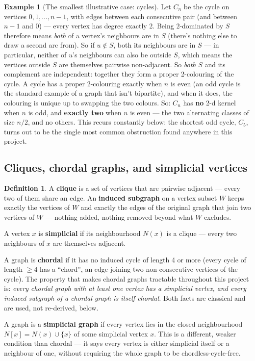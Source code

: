 \documentclass[11pt]{article}
\theoremstyle{plain}
\theoremstyle{definition}
\newtheorem{definition}[theorem]{Definition}
\newtheorem{example}[theorem]{Example}
\theoremstyle{remark}
\begin{document}
\begin{example}[The smallest illustrative case: cycles]
\label{ex:cycle}
Let $C_n$ be the cycle on vertices $0, 1, \dots, n-1$, with edges between each
consecutive pair (and between $n-1$ and $0$) — every vertex has degree exactly 2.
Being 2-dominated by $S$ therefore means \emph{both} of a vertex's neighbours are in
$S$ (there's nothing else to draw a second arc from). So if $u \notin S$, both its
neighbours are in $S$ --- in particular, neither of $u$'s neighbours can also be
outside $S$, which means the vertices outside $S$ are themselves pairwise
non-adjacent. So \emph{both} $S$ and its complement are independent: together they
form a proper 2-colouring of the cycle. A cycle has a proper 2-colouring exactly when
$n$ is even (an odd cycle is the standard example of a graph that isn't bipartite),
and when it does, the colouring is unique up to swapping the two colours. So: $C_n$
has \textbf{no} 2-d kernel when $n$ is odd, and \textbf{exactly two} when $n$ is even ---
the two alternating classes of size $n/2$, and no others. This recurs constantly
below: the shortest odd cycle, $C_5$, turns out to be the single most common
obstruction found anywhere in this project.
\end{example}

\subsection{Cliques, chordal graphs, and simplicial vertices}

\begin{definition}
A \textbf{clique} is a set of vertices that are pairwise adjacent — every two of them
share an edge. An \textbf{induced subgraph} on a vertex subset $W$ keeps exactly the
vertices of $W$ and exactly the edges of the original graph that join two vertices of
$W$ — nothing added, nothing removed beyond what $W$ excludes.

A vertex $x$ is \textbf{simplicial} if its neighbourhood $N(x)$ is a clique — every two
neighbours of $x$ are themselves adjacent.

A graph is \textbf{chordal} if it has no induced cycle of length 4 or more (every
cycle of length $\ge 4$ has a ``chord'', an edge joining two non-consecutive vertices
of the cycle). The property that makes chordal graphs tractable throughout this
project is: \emph{every chordal graph with at least one vertex has a simplicial
vertex, and every induced subgraph of a chordal graph is itself chordal.} Both facts
are classical and are used, not re-derived, below.

A graph is a \textbf{simplicial graph} if every vertex lies in the closed neighbourhood
$N[x] = N(x) \cup \{x\}$ of some simplicial vertex $x$. This is a different, weaker
condition than chordal — it says every vertex is either simplicial itself or a
neighbour of one, without requiring the whole graph to be chordless-cycle-free.
\end{definition}
\end{document}

